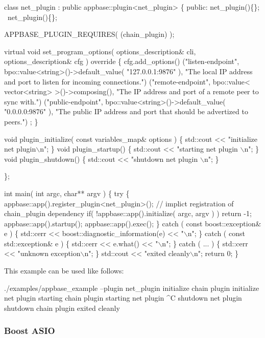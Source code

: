\begin{DoxyCode}
class net\_plugin : public appbase::plugin<net\_plugin>
\{
   public:
     net\_plugin()\{\};
     ~net\_plugin()\{\};

     APPBASE\_PLUGIN\_REQUIRES( (chain\_plugin) );

     virtual void set\_program\_options( options\_description& cli, options\_description& cfg ) override
     \{
        cfg.add\_options()
              ("listen-endpoint", bpo::value<string>()->default\_value( "127.0.0.1:9876" ), "The local IP
       address and port to listen for incoming connections.")
              ("remote-endpoint", bpo::value< vector<string> >()->composing(), "The IP address and port of
       a remote peer to sync with.")
              ("public-endpoint", bpo::value<string>()->default\_value( "0.0.0.0:9876" ), "The public IP
       address and port that should be advertized to peers.")
              ;
     \}

     void plugin\_initialize( const variables\_map& options ) \{ std::cout << "initialize net plugin\(\backslash\)n"; \}
     void plugin\_startup()  \{ std::cout << "starting net plugin \(\backslash\)n"; \}
     void plugin\_shutdown() \{ std::cout << "shutdown net plugin \(\backslash\)n"; \}

\};

int main( int argc, char** argv ) \{
   try \{
      appbase::app().register\_plugin<net\_plugin>(); // implict registration of chain\_plugin dependency
      if( !appbase::app().initialize( argc, argv ) )
         return -1;
      appbase::app().startup();
      appbase::app().exec();
   \} catch ( const boost::exception& e ) \{
      std::cerr << boost::diagnostic\_information(e) << "\(\backslash\)n";
   \} catch ( const std::exception& e ) \{
      std::cerr << e.what() << "\(\backslash\)n";
   \} catch ( ... ) \{
      std::cerr << "unknown exception\(\backslash\)n";
   \}
   std::cout << "exited cleanly\(\backslash\)n";
   return 0;
\}
\end{DoxyCode}


This example can be used like follows\+:


\begin{DoxyCode}
./examples/appbase\_example --plugin net\_plugin
initialize chain plugin
initialize net plugin
starting chain plugin
starting net plugin
^C
shutdown net plugin
shutdown chain plugin
exited cleanly
\end{DoxyCode}


\subsubsection*{Boost A\+S\+IO}

